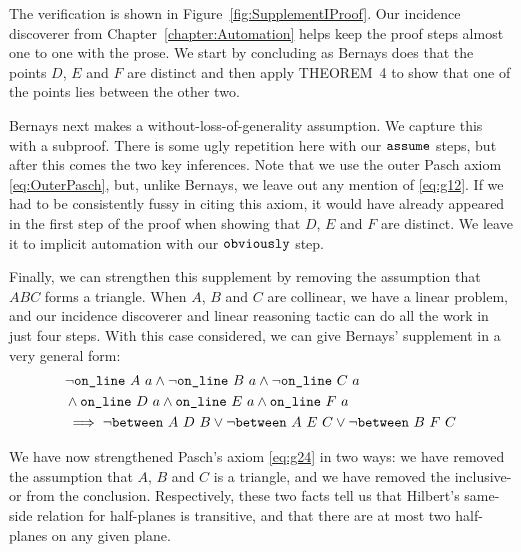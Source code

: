 The verification is shown in Figure~\ref{fig:SupplementIProof}. Our incidence discoverer from Chapter~\ref{chapter:Automation} helps keep the proof steps almost one to one with the prose. We start by concluding as Bernays does that the points $D$, $E$ and $F$ are distinct and then apply THEOREM~4 to show that one of the points lies between the other two.

Bernays next makes a without-loss-of-generality assumption. We capture this with a subproof. There is some ugly repetition here with our $\texttt{assume}$ steps, but after this comes the two key inferences. Note that we use the outer Pasch axiom \eqref{eq:OuterPasch}, but, unlike Bernays, we leave out any mention of \eqref{eq:g12}. If we had to be consistently fussy in citing this axiom, it would have already appeared in the first step of the proof when showing that $D$, $E$ and $F$ are distinct. We leave it to implicit automation with our $\texttt{obviously}$ step.

Finally, we can strengthen this supplement by removing the assumption that $ABC$ forms a triangle. When $A$, $B$ and $C$ are collinear, we have a linear problem, and our incidence discoverer and linear reasoning tactic can do all the work in just four steps. With this case considered, we can give Bernays' supplement in a very general form:
\begin{equation}\label{eq:SupplementI}
  \begin{split}
    &\neg\texttt{on\_line}\ A\ a \wedge \neg\texttt{on\_line}\ B\ a \wedge \neg\texttt{on\_line}\ C\ a\\
    &\wedge \texttt{on\_line}\ D\ a \wedge \texttt{on\_line}\ E\ a \wedge \texttt{on\_line}\ F\ a\\
    &\implies \neg\texttt{between}\ A\ D\ B \vee \neg\texttt{between}\ A\ E\ C \vee \neg\texttt{between}\ B\ F\ C
  \end{split}
\end{equation}

We have now strengthened Pasch's axiom \eqref{eq:g24} in two ways: we have removed the assumption that $A$, $B$ and $C$ is a triangle, and we have removed the inclusive-or from the conclusion. Respectively, these two facts tell us that Hilbert's same-side relation for half-planes is transitive, and that there are at most two half-planes on any given plane.

